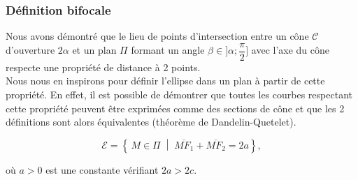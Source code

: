 \subsubsection{Définition bifocale}\label{section:ellbifo}
Nous avons démontré que le lieu de points d'intersection entre un cône $\mathcal{C}$ d'ouverture $2 \alpha$ et un plan $\Pi$ formant un angle $\beta \in ]\alpha;\dfrac{\pi}{2}]$ avec l'axe du cône respecte une propriété de distance à 2 points.\\
Nous nous en inspirons pour définir l'ellipse dans un plan à partir de cette propriété. 
En effet, il est possible de démontrer que toutes les courbes respectant cette propriété peuvent être exprimées comme des sections de cône et que les 2 définitions sont alors équivalentes (théorème de Dandelin-Quetelet).

\begin{tcolorbox}[colback=cyan!5, colframe=cyan!70!blue, title=Définition bifocale de l'ellipse]

\begin{equation}
    \mathcal{E}=\left\{\, M \in \Pi \;\middle|\; 
\overline{MF_1} + \overline{MF_2} = 2a \right\},
\end{equation}


où $a >0 $ est une constante vérifiant $2a > 2c.$
\end{tcolorbox}

\vspace{0.5cm}

